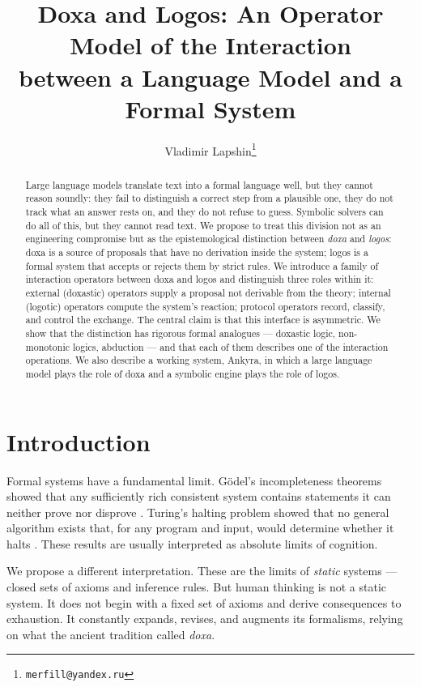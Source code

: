 \documentclass[12pt,a4paper]{article}
\title{Doxa and Logos: An Operator Model of the Interaction\\
between a Language Model and a Formal System}
\author{Vladimir Lapshin\thanks{\texttt{merfill@yandex.ru}}}
\date{}
\begin{document}
\maketitle

\begin{abstract}
Large language models translate text into a formal language well, but they
cannot reason soundly: they fail to distinguish a correct step from a
plausible one, they do not track what an answer rests on, and they do not refuse to
guess. Symbolic solvers can do all of this, but they cannot read text. We
propose to treat this division not as an engineering compromise but as the
epistemological distinction between \emph{doxa} and \emph{logos}: doxa is a
source of proposals that have no derivation inside the system; logos is a
formal system that accepts or rejects them by strict rules. We introduce a
family of interaction operators between doxa and logos and distinguish three
roles within it: external (doxastic) operators supply a proposal not derivable
from the theory; internal (logotic) operators compute the system's reaction;
protocol operators record, classify, and control the exchange. The central
claim is that this interface is asymmetric. We show that the distinction has
rigorous formal analogues --- doxastic logic, non-monotonic logics, abduction
--- and that each of them describes one of the interaction operations. We also
describe a working system, Ankyra, in which a large language model plays the
role of doxa and a symbolic engine plays the role of logos.
\end{abstract}

\section{Introduction}
\label{sec:intro}

Formal systems have a fundamental limit. G\"odel's incompleteness theorems
showed that any sufficiently rich consistent system contains statements it can
neither prove nor disprove \cite{godel}. Turing's halting problem showed that
no general algorithm exists that, for any program and input, would determine
whether it halts \cite{turing36}. These results are usually interpreted as
absolute limits of cognition.

We propose a different interpretation. These are the limits of \emph{static}
systems --- closed sets of axioms and inference rules. But human thinking is
not a static system. It does not begin with a fixed set of axioms and derive
consequences to exhaustion. It constantly expands, revises, and augments its
formalisms, relying on what the ancient tradition called \emph{doxa}.
\end{document}
